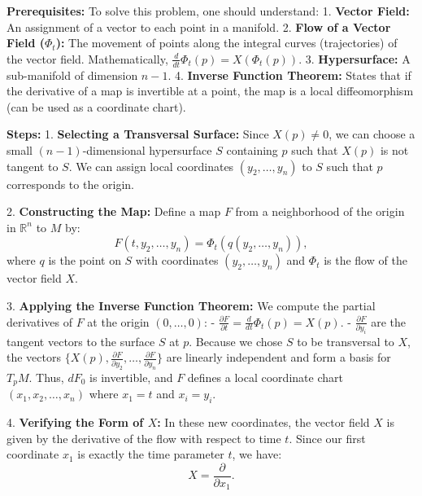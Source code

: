 \begin{solution}
\textbf{Prerequisites:}
To solve this problem, one should understand:
1. \textbf{Vector Field:} An assignment of a vector to each point in a manifold.
2. \textbf{Flow of a Vector Field ($\Phi_t$):} The movement of points along the integral curves (trajectories) of the vector field. Mathematically, $\frac{d}{dt}\Phi_t(p) = X(\Phi_t(p))$.
3. \textbf{Hypersurface:} A sub-manifold of dimension $n-1$.
4. \textbf{Inverse Function Theorem:} States that if the derivative of a map is invertible at a point, the map is a local diffeomorphism (can be used as a coordinate chart).
\par\vspace{\baselineskip}

\textbf{Steps:}
1. \textbf{Selecting a Transversal Surface:}
Since $X(p) \neq 0$, we can choose a small $(n-1)$-dimensional hypersurface $S$ containing $p$ such that $X(p)$ is not tangent to $S$. We can assign local coordinates $(y_2, \dots, y_n)$ to $S$ such that $p$ corresponds to the origin.
\par\vspace{\baselineskip}

2. \textbf{Constructing the Map:}
Define a map $F$ from a neighborhood of the origin in $\mathbb{R}^n$ to $M$ by:
\[ F(t, y_2, \dots, y_n) = \Phi_t(q(y_2, \dots, y_n)), \]
where $q$ is the point on $S$ with coordinates $(y_2, \dots, y_n)$ and $\Phi_t$ is the flow of the vector field $X$.
\par\vspace{\baselineskip}

3. \textbf{Applying the Inverse Function Theorem:}
We compute the partial derivatives of $F$ at the origin $(0, \dots, 0)$:
- $\frac{\partial F}{\partial t} = \frac{d}{dt} \Phi_t(p) = X(p)$.
- $\frac{\partial F}{\partial y_i}$ are the tangent vectors to the surface $S$ at $p$.
Because we chose $S$ to be transversal to $X$, the vectors $\{X(p), \frac{\partial F}{\partial y_2}, \dots, \frac{\partial F}{\partial y_n}\}$ are linearly independent and form a basis for $T_p M$. Thus, $dF_0$ is invertible, and $F$ defines a local coordinate chart $(x_1, x_2, \dots, x_n)$ where $x_1 = t$ and $x_i = y_i$.
\par\vspace{\baselineskip}

4. \textbf{Verifying the Form of $X$:}
In these new coordinates, the vector field $X$ is given by the derivative of the flow with respect to time $t$. Since our first coordinate $x_1$ is exactly the time parameter $t$, we have:
\[ X = \frac{\partial}{\partial x_1}. \]
\par\vspace{\baselineskip}


\end{solution}

